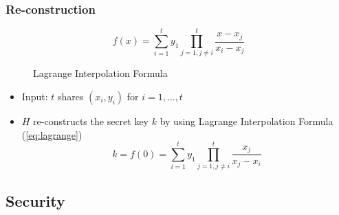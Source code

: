 \subsubsection*{Re-construction}
\begin{figure}[H]
  \begin{equation}\label{eq:lagrange}
    f(x) = \sum\limits_{i=1}^t y_1 \prod\limits_{j=1, j\not=i}^t \frac{x-x_j}{x_i-x_j}
  \end{equation}
  \label{asdf}
  \caption{Lagrange Interpolation Formula}
\end{figure}

\begin{itemize}
\item Input: $t$ shares $(x_i, y_i)$ for $i = 1, \ldots, t$
\item $H$ re-constructs the secret key $k$ by using Lagrange Interpolation Formula (\ref{eq:lagrange})
  \[
  k = f(0) = \sum\limits_{i=1}^t y_1 \prod\limits_{j=1, j\not=i}^t \frac{x_j}{x_j-x_i}
  \]
\end{itemize}

\subsection{Security}